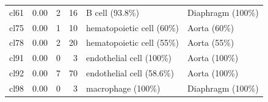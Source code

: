 \begin{table}[ht!]
\begin{tabular}{lrrrll}
  cl61 & 0.00 &   2 &  16 & B cell (93.8\%) & Diaphragm (100\%) \\ 
  cl75 & 0.00 &   1 &  10 & hematopoietic cell (60\%) & Aorta (60\%) \\ 
  cl78 & 0.00 &   2 &  20 & hematopoietic cell (55\%) & Aorta (55\%) \\ 
  cl91 & 0.00 &   0 &   3 & endothelial cell (100\%) & Aorta (100\%) \\ 
  cl92 & 0.00 &   7 &  70 & endothelial cell (58.6\%) & Aorta (100\%) \\ 
  cl98 & 0.00 &   0 &   3 & macrophage (100\%) & Diaphragm (100\%) \\ 
   \bottomrule
\end{tabular}
\end{table}


